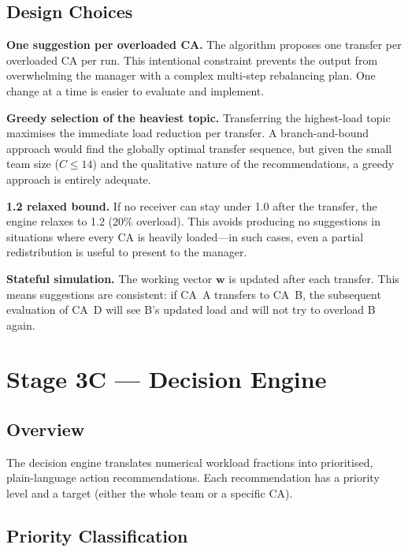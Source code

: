 \documentclass[12pt,a4paper]{report}
\begin{document}
\subsection{Design Choices}

\textbf{One suggestion per overloaded CA.}
The algorithm proposes one transfer per overloaded CA per run. This
intentional constraint prevents the output from overwhelming the manager
with a complex multi-step rebalancing plan. One change at a time is
easier to evaluate and implement.

\textbf{Greedy selection of the heaviest topic.}
Transferring the highest-load topic maximises the immediate load
reduction per transfer. A branch-and-bound approach would find the
globally optimal transfer sequence, but given the small team size
($C \leq 14$) and the qualitative nature of the recommendations,
a greedy approach is entirely adequate.

\textbf{1.2 relaxed bound.}
If no receiver can stay under 1.0 after the transfer, the engine
relaxes to 1.2 (20\% overload). This avoids producing no suggestions
in situations where every CA is heavily loaded---in such cases, even
a partial redistribution is useful to present to the manager.

\textbf{Stateful simulation.}
The working vector $\mathbf{w}$ is updated after each transfer. This
means suggestions are consistent: if CA~A transfers to CA~B, the
subsequent evaluation of CA~D will see B's updated load and will not
try to overload B again.

\section{Stage 3C --- Decision Engine}
\label{sec:decisions}

\subsection{Overview}

The decision engine translates numerical workload fractions into
prioritised, plain-language action recommendations. Each recommendation
has a priority level and a target (either the whole team or a specific CA).

\subsection{Priority Classification}
\end{document}
